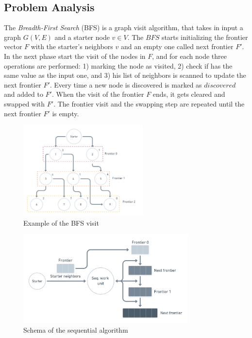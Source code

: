 \subsection{Problem Analysis}
\label{sec:Problem_Analysis}
The \textit{Breadth-First Search} (BFS) is a graph visit algorithm, that takes in input a graph $G(V, E)$ and a starter node $v\in V$. The $BFS$ starts initializing the frontier vector $F$ with the starter's neighbors $v$ and an empty one called next frontier $F'$. In the next phase start the visit of the nodes in $F$, and for each node three operations are performed: 1) marking the node as visited, 2) check if has the same value as the input one, and 3) his list of neighbors is scanned to update the next frontier $F'$. Every time a new node is discovered is marked as $discovered$ and added to $F'$. When the visit of the frontier $F$ ends, it gets cleared and swapped with $F'$. The frontier visit and the swapping step are repeated until the next frontier $F'$ is empty. 

\begin{figure}[htb!]
    \centering
    \includegraphics[width=0.58\textwidth]{Figures/seq_schema.png}
    \caption{Example of the BFS visit}
    \label{fig:bfs_tree}
\end{figure}
\FloatBarrier

\begin{figure}[htb!]
    \centering
    \includegraphics[width=0.8\textwidth]{Figures/seq_comp_schema.png}
    \caption{Schema of the sequential algorithm}
    \label{fig:bfs_seq_schema}
\end{figure}
\FloatBarrier

